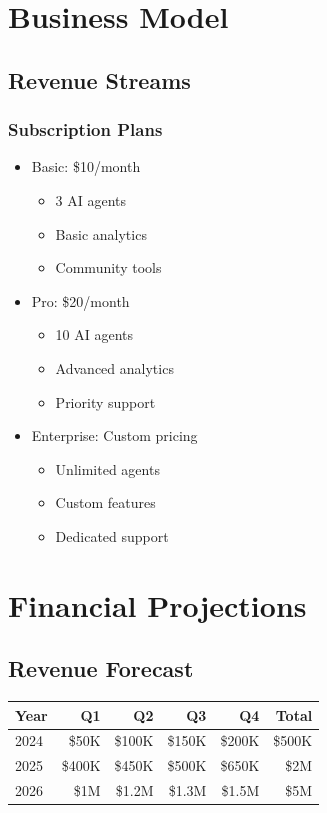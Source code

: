\documentclass[11pt]{article}
\begin{document}
\section{Business Model}

\subsection{Revenue Streams}
\subsubsection{Subscription Plans}
\begin{itemize}
    \item Basic: \$10/month
    \begin{itemize}
        \item 3 AI agents
        \item Basic analytics
        \item Community tools
    \end{itemize}
    \item Pro: \$20/month
    \begin{itemize}
        \item 10 AI agents
        \item Advanced analytics
        \item Priority support
    \end{itemize}
    \item Enterprise: Custom pricing
    \begin{itemize}
        \item Unlimited agents
        \item Custom features
        \item Dedicated support
    \end{itemize}
\end{itemize}

\section{Financial Projections}

\subsection{Revenue Forecast}
\begin{center}
\begin{tabular}{|l|r|r|r|r|r|}
\hline
Year & Q1 & Q2 & Q3 & Q4 & Total \\
\hline
2024 & \$50K & \$100K & \$150K & \$200K & \$500K \\
2025 & \$400K & \$450K & \$500K & \$650K & \$2M \\
2026 & \$1M & \$1.2M & \$1.3M & \$1.5M & \$5M \\
\hline
\end{tabular}
\end{center}
\end{document}
